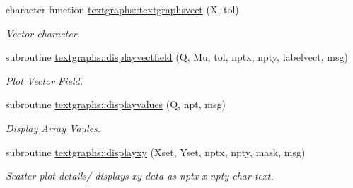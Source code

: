 \begin{DoxyCompactItemize}
character function \hyperlink{namespacetextgraphs_a3ce903686e3a69e50f07b7f1461c53c6}{textgraphs\+::textgraphsvect} (X, tol)
\begin{DoxyCompactList}\small\item\em Vector character. \end{DoxyCompactList}\item 
subroutine \hyperlink{namespacetextgraphs_ae7171ed6f50b5b8b77aabd136316a6b8}{textgraphs\+::displayvectfield} (Q, Mu, tol, nptx, npty, labelvect, msg)
\begin{DoxyCompactList}\small\item\em Plot Vector Field. \end{DoxyCompactList}\item 
subroutine \hyperlink{namespacetextgraphs_a7f733ce4082530e8bfeb1750d4870575}{textgraphs\+::displayvalues} (Q, npt, msg)
\begin{DoxyCompactList}\small\item\em Display Array Vaules. \end{DoxyCompactList}\item 
subroutine \hyperlink{namespacetextgraphs_a857fceafb9446a13966f54fbbce35773}{textgraphs\+::displayxy} (Xset, Yset, nptx, npty, mask, msg)
\begin{DoxyCompactList}\small\item\em Scatter plot details/ displays xy data as nptx x npty char text. \end{DoxyCompactList}\end{DoxyCompactItemize}
